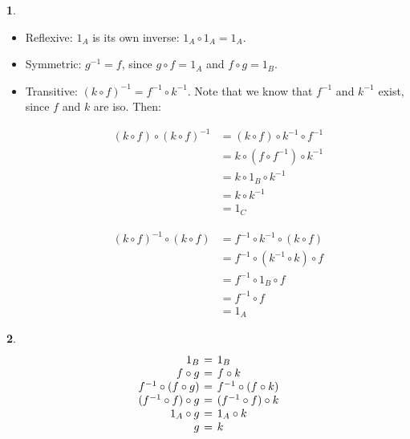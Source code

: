 \documentclass{article}
\theoremstyle{definition}
\theoremstyle{definition}
\theoremstyle{definition}
\newtheorem{solution-internal}{}[subsection]
\newenvironment{solution}{
  \begin{solution-internal}
}{
  \end{solution-internal}
}
\begin{document}
\begin{solution}
$ $ %
\begin{itemize}
\item Reflexive: $1_A$ is its own inverse: $1_A \circ 1_A = 1_A$.
\item Symmetric: $g^{-1} = f$, since $g \circ f = 1_A$ and $f \circ g = 1_B$.
\item Transitive: ${(k \circ f)}^{-1} = f^{-1} \circ k^{-1}$. Note that we know
that $f^{-1}$ and $k^{-1}$ exist, since $f$ and $k$ are iso. Then: 

\begin{minipage}{.4\textwidth}
\begin{align*}
  (k \circ f) \circ {(k \circ f)}^{-1} &= (k \circ f) \circ k^{-1} \circ f^{-1} \\
   &= k \circ (f \circ f^{-1}) \circ k^{-1} \\
   &= k \circ 1_B \circ k^{-1} \\
   &= k \circ k^{-1} \\
   &= 1_C
\end{align*}
\end{minipage}\hspace{32pt}%
\begin{minipage}{.4\textwidth}
\begin{align*}
  {(k \circ f)}^{-1} \circ (k \circ f) &=  f^{-1} \circ k^{-1} \circ (k \circ f) \\
   &= f^{-1} \circ (k^{-1} \circ k) \circ f \\
   &= f^{-1} \circ 1_B \circ f \\
   &= f^{-1} \circ f \\
   &= 1_A
\end{align*}
\end{minipage}
\end{itemize}
\end{solution}

\begin{solution}
\[
\arraycolsep=2pt
\begin{array}{rcl}
  1_B                      & = & 1_B \\
  f \circ g                & = & f \circ k \\
  f^{-1} \circ (f \circ g) & = & f^{-1} \circ (f \circ k) \\
  (f^{-1} \circ f) \circ g & = & (f^{-1} \circ f) \circ k \\
  1_A \circ g              & = & 1_A \circ k \\
  g                        & = & k
\end{array}
\]
\end{solution}
\end{document}
